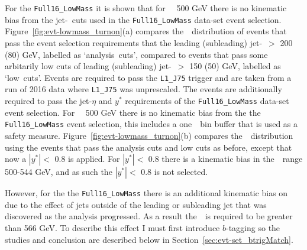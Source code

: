 
For the \verb|Full16_LowMass| it is shown that for \mjj~\gt~500 GeV there is no kinematic bias
from the jet-\pT~cuts used in the \verb|Full16_LowMass| data-set event selection.
Figure~\ref{fig:evt-lowmass_turnon}(a) compares the~\mjj~distribution of events
that pass the event selection requirements that the leading (subleading) jet-\pT~$>$ 200 (80) GeV, labelled as `analysis~cuts',
compared to events that pass some arbitarily low cuts of leading (subleading) jet-\pT~$>$ 150 (50) GeV, labelled as `low~cuts'.
Events are required to pass the \verb|L1_J75| trigger and are taken from a run of 2016 data where \verb|L1_J75| was unprescaled.
The events are additionally required to pass the jet-$\eta$ and $y^*$ requirements of the \verb|Full16_LowMass| data-set event selection.
For \mjj~\gt~500 GeV there is no kinematic bias from the the \verb|Full16_LowMass| event selection,
this includes a one~\mjj~bin buffer that is used as a safety measure.
Figure~\ref{fig:evt-lowmass_turnon}(b) compares the~\mjj~distribution using the events that pass the analysis cuts and low cuts as before,
except that now a $|y^*| <$ 0.8 is applied.
For $|y^*| <$ 0.8 there is a kinematic bias in the~\mjj~range 500-544 GeV,
and as such the $|y^*| <$ 0.8 is not selected.

However, for the the \verb|Full16_LowMass|
there is an additional kinematic bias on~\mjj~
due to the effect of jets outside of the leading or subleading jet
that was discovered as the analysis progressed.
As a result the~\mjj~is required to be greater than 566 GeV.
To describe this effect I must first introduce $b$-tagging so
the studies and conclusion are described below in Section~\ref{sec:evt-set_btrigMatch}.

